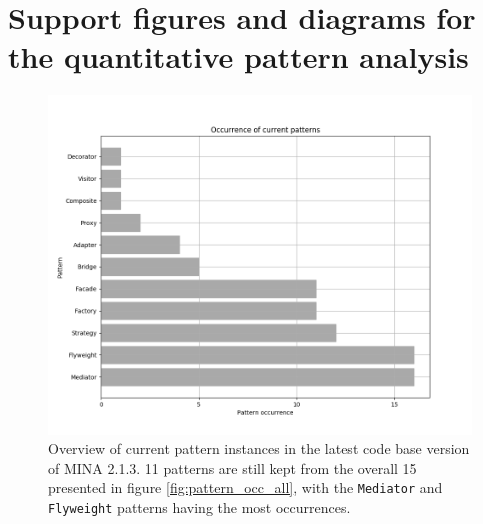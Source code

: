 \section{Support figures and diagrams for the quantitative pattern analysis}
\label{sec:quantitative_analysis_figures}

\begin{figure}[H]
    \centering
    \includegraphics[width = \textwidth]{images/graphs/pattern_occurrence_current.png}
    \caption{Overview of current pattern instances in the latest code base version of MINA 2.1.3. 11 patterns are still kept from the overall 15 presented in figure \ref{fig:pattern_occ_all}, with the \texttt{Mediator} and \texttt{Flyweight} patterns having the most occurrences.}
\label{fig:pattern_occ_current}
\end{figure}

